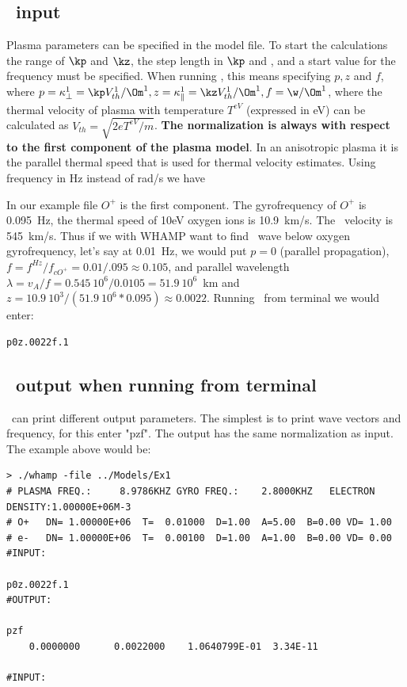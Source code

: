 \documentclass[a4,10pt]{article}
\begin{document}
\subsection{\WHAMP\ input}
Plasma parameters can be specified in the model file. To start the calculations the range of $\kp$ and $\kz$, the step length in $\kp$ and \kz, and a start value for the frequency must be specified. When running \WHAMP, this means specifying $p,z$ and $f$, where $p=\kappa_\perp^1=\kp V_{th}^1/\Om^1, z=\kappa_\parallel^1=\kz V_{th}^1/\Om^1, f=\w/\Om^1$, where the thermal velocity of plasma with temperature $T^{eV}$ (expressed in eV) can be calculated as $V_{th}=\sqrt{2 e T^{eV}/m}$. \textbf{The normalization is always with respect to the first component of the plasma model}. In an anisotropic plasma it is the parallel thermal speed that is used for thermal velocity estimates. 
Using frequency in Hz instead of rad/s we have

In our example file $O^+$ is the first component. The gyrofrequency of $O^+$ is 0.095~Hz, the thermal speed of 10eV oxygen ions is 10.9~km/s. The \Alfven\ velocity is 545~km/s. Thus if we with WHAMP want to find \Alfven\ wave below oxygen gyrofrequency, let's say at 0.01~Hz, we would put $p=0$ (parallel propagation), $f=f^{Hz}/f_{cO^+}=0.01/.095\approx 0.105$, and parallel wavelength $\lambda=v_A/f=0.545\ 10^6/0.0105=51.9\ 10^6$~km and $z=10.9\ 10^3/(51.9\  10^6*0.095)\approx 0.0022$. Running \WHAMP\ from terminal we would enter:

\begin{verbatim}
p0z.0022f.1
\end{verbatim}

\subsection{\WHAMP\ output when running from terminal}
\WHAMP\ can print different output parameters. The simplest is to print wave vectors and frequency, for this enter "pzf". The output has the same normalization as input. The example above would be:

\begin{verbatim}
> ./whamp -file ../Models/Ex1
# PLASMA FREQ.:     8.9786KHZ GYRO FREQ.:    2.8000KHZ   ELECTRON DENSITY:1.00000E+06M-3
# O+   DN= 1.00000E+06  T=  0.01000  D=1.00  A=5.00  B=0.00 VD= 1.00
# e-   DN= 1.00000E+06  T=  0.00100  D=1.00  A=1.00  B=0.00 VD= 0.00
#INPUT:

p0z.0022f.1
#OUTPUT:

pzf
    0.0000000      0.0022000    1.0640799E-01  3.34E-11

#INPUT:
\end{verbatim}
\end{document}
